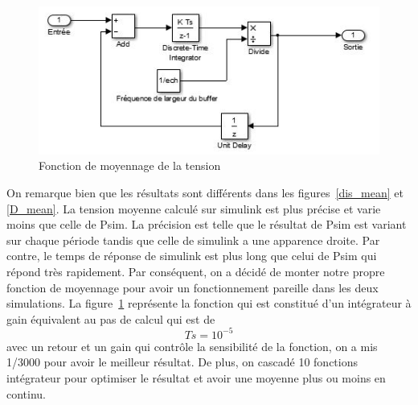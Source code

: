 \documentclass[11pt,letterpaper,final]{report}
\begin{document}
\begin{figure}[ht]
\centering
\includegraphics[scale=0.8]{fig/moy.jpg}
\caption{Fonction de moyennage de la tension}
\label{moy}
\end{figure}
On remarque bien que les résultats sont différents dans les figures~\ref{dis_mean} et \ref{D_mean}. La tension moyenne calculé sur simulink est plus précise  et varie moins que celle de Psim. La précision est telle que le résultat de Psim est variant sur chaque période tandis que celle de simulink a une apparence droite. Par contre, le temps de réponse de simulink est plus long que celui de Psim qui répond très rapidement. Par conséquent, on a décidé de monter notre propre fonction de moyennage pour avoir un fonctionnement pareille dans les deux simulations. La figure~\ref{moy} représente la fonction qui est constitué d'un intégrateur à gain équivalent au pas de calcul qui est de
\begin{equation}
Ts = 10^{-5}
\end{equation} avec un retour et un gain qui contrôle la sensibilité de la fonction, on a mis 1/3000 pour avoir le meilleur résultat. De plus, on cascadé 10 fonctions intégrateur pour optimiser le résultat et avoir une moyenne plus ou moins en continu.
\end{document}
